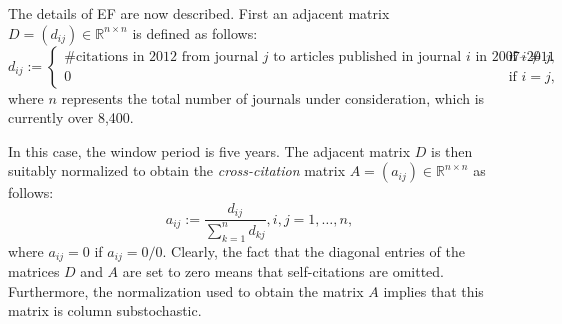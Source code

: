\documentclass[11pt,draftcls,onecolumn]{IEEEtran}
\newcommand{\field}[1]{{\mathbb{#1}}}
\newcommand{\R}{\field{R}}
\begin{document}
The details of EF are now described. First an adjacent matrix 
$D=(d_{ij})\in\R^{n\times n}$ is defined as follows: 
\begin{equation*}
 d_{ij} 
  := \begin{cases}
      \mbox{\# citations in 2012 from journal $j$ to articles published in journal $i$ in 2007--2011} & \text{if $i \not = j$},\\
      0             & \text{if $i=j$},
    \end{cases}
\end{equation*}
where $n$ represents the total number of journals under consideration, which is currently 
over 8,400.


In this case, the window period is five years. The adjacent matrix $D$ is then 
suitably normalized to obtain the {\it cross-citation} matrix $A=(a_{ij})\in\R^{n\times n}$ 
as follows:
$$
a_{ij}:= \frac{d_{ij}}{\sum_{k=1}^n d_{kj}}, i, j=1,\ldots,n,
$$
where $a_{ij} =0$ if $a_{ij} =0/0$. Clearly, the fact that the diagonal entries of the matrices 
$D$ and $A$ are set to zero means that self-citations are omitted. Furthermore, the normalization 
used to obtain the matrix $A$ implies that this matrix is column substochastic.
\end{document}
